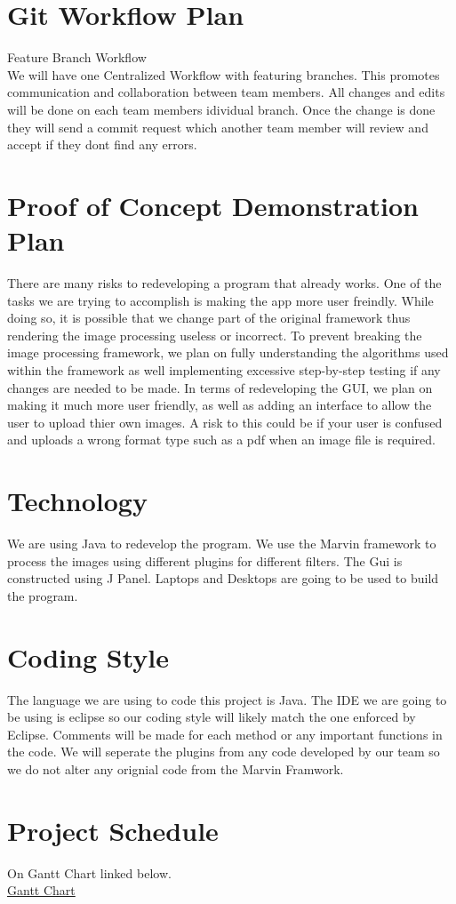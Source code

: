 \documentclass{article}
\begin{document}
\section{Git Workflow Plan}
Feature Branch Workflow\\
We will have one Centralized Workflow with featuring branches. This promotes communication and collaboration between team members. All changes and edits will be done on each team members idividual branch. Once the change is done they will send a commit request which another team member will review and accept if they dont find any errors.

\section{Proof of Concept Demonstration Plan}
There are many risks to redeveloping a program that already works. One of the tasks we are trying to accomplish is making the app more user freindly. While doing so, it is possible that we change part of the original framework thus rendering the image processing useless or incorrect. To prevent breaking the image processing framework, we plan on fully understanding the algorithms used within the framework as well implementing excessive step-by-step testing if any changes are needed to be made. In terms of redeveloping the GUI, we plan on making it much more user friendly, as well as adding an interface to allow the user to upload thier own images. A risk to this could be if your user is confused and uploads a wrong format type such as a pdf when an image file is required.

\section{Technology}
We are using Java to redevelop the program. We use the Marvin framework to process the images using different plugins for different filters. The Gui is constructed using J Panel. Laptops and Desktops are going to be used to build the program.

\section{Coding Style}
The language we are using to code this project is Java. The IDE we are going to be using is eclipse so our coding style will likely match the one enforced by Eclipse. Comments will be made for each method or any important functions in the code. We will seperate the plugins from any code developed by our team so we do not alter any orignial code from the Marvin Framwork.

\section{Project Schedule}
On Gantt Chart linked below.\\
\href{https://gitlab.cas.mcmaster.ca/dimitn/image_processing_app/blob/master/ProjectSchedule/3XA3Gantt.pdf}{Gantt Chart}
\end{document}
